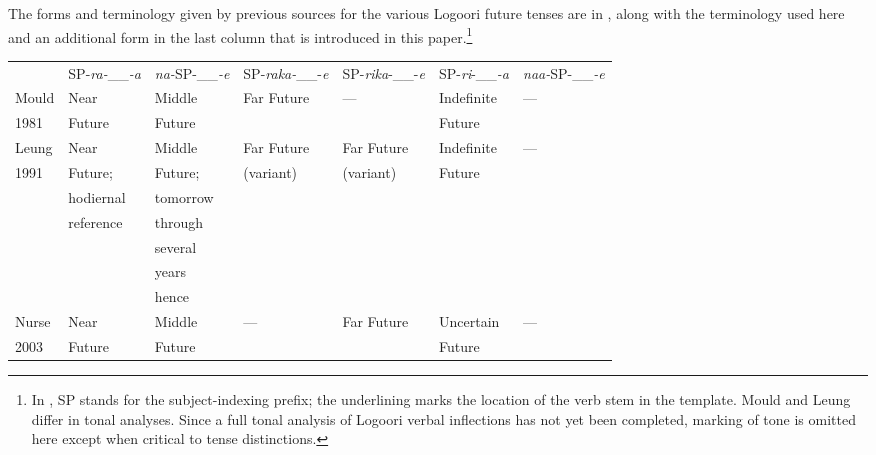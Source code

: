 \documentclass[output=paper]{langsci/langscibook}
\begin{document}
The forms and terminology given by previous sources for the various Logoori future tenses are in , along with the terminology used here and an additional form in the last column that is introduced in this paper.\footnote{ In , SP stands for the subject-indexing prefix; the underlining marks the location of the verb stem in the template. Mould and Leung differ in tonal analyses. Since a full tonal analysis of Logoori verbal inflections has not yet been completed, marking of tone is omitted here except when critical to tense distinctions. } 

\begin{table}
\begin{tabular}{lllllll} & \scriptsize SP-\textit{ra-}\_\_\textit{{}-a} & \scriptsize \textit{na-}SP-\_\_\textit{{}-e} & \scriptsize SP-\textit{raka-}\_\_-\textit{e} & \scriptsize SP-\textit{rika}{}-\_\_-\textit{e} & \scriptsize SP-\textit{ri}{}-\_\_\textit{{}-a} & \scriptsize \textit{naa-}SP-\_\_\textit{{}-e} \\
\lsptoprule
\footnotesize Mould & \footnotesize Near & \footnotesize Middle & \footnotesize Far Future & \footnotesize — & \footnotesize Indefinite & \footnotesize — \\ 
\footnotesize 1981 & \footnotesize Future & \footnotesize Future & & & \footnotesize Future & \\ \hline
\footnotesize Leung & \footnotesize Near & \footnotesize Middle & \footnotesize Far Future & \footnotesize Far Future & \footnotesize Indefinite & \mdseries \footnotesize — \\ 
\footnotesize 1991 & \footnotesize Future; & \footnotesize Future; & \footnotesize (variant) & \footnotesize (variant) & \footnotesize Future & \\
& \footnotesize hodiernal & \footnotesize tomorrow & & & &  \\
& \footnotesize reference & \footnotesize through & & & & \\
& & \footnotesize several & & & & \\
& & \footnotesize years & & & & \\
& & \footnotesize hence & & & & \\
\hline 
\footnotesize Nurse & \footnotesize Near & \footnotesize Middle & \footnotesize — & \footnotesize Far Future & \footnotesize Uncertain & \mdseries \footnotesize — \\ 
\footnotesize 2003 & \footnotesize Future & \footnotesize Future & & & \footnotesize Future & \\ \hline

\end{tabular}
\end{table}
\end{document}
